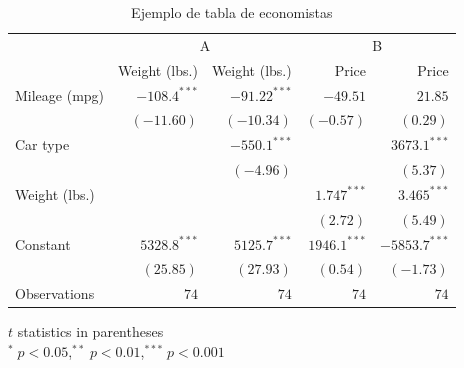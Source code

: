 \documentclass[a4paper,article,oneside,11pt]{memoir}
\begin{document}
\begin{table}[htp]
    \centering
    \begin{tabular}{@{}lrrrr@{}}
        \toprule
        & \multicolumn{2}{c}{A} & \multicolumn{2}{c}{B} \\
        \cmidrule(lr){2-3} \cmidrule(l){4-5}
        & Weight (lbs.) & Weight (lbs.) & Price & Price \\
        \midrule
        Mileage (mpg) & $-108.4^{***}$ & $-91.22^{***}$ & $-49.51$ & $21.85$ \\
         & $(-11.60)$ & $(-10.34)$ & $(-0.57)$ & $(0.29)$ \\[0.5em]
        Car type & & $-550.1^{***}$ & & $3673.1^{***}$ \\
        & & $(-4.96)$ & & $(5.37)$ \\[0.5em]
        Weight (lbs.) & & & $1.747^{***}$ & $3.465^{***}$ \\
        & & & $(2.72)$ & $(5.49)$ \\[0.5em]
        Constant & $5328.8^{***}$ & $5125.7^{***}$ & $1946.1^{***}$ & $-5853.7^{***}$ \\
        & $(25.85)$ & $(27.93)$ & $(0.54)$ & $(-1.73)$ \\
        \midrule
        Observations & $74$ & $74$ & $74$ & $74$ \\
        \bottomrule
    \end{tabular}

    \smallskip
    {\raggedright\scriptsize \hspace{3.5em}$t$ statistics in parentheses \hfill \\
    \hspace{3.5em}$^* \; p < 0.05$,\quad $^{**} \; p < 0.01$,\quad $^{***} \; p < 0.001$\hfill}
    \caption{Ejemplo de tabla de economistas \smiley}
    \label{tab:tablita eco}
\end{table}
\end{document}
